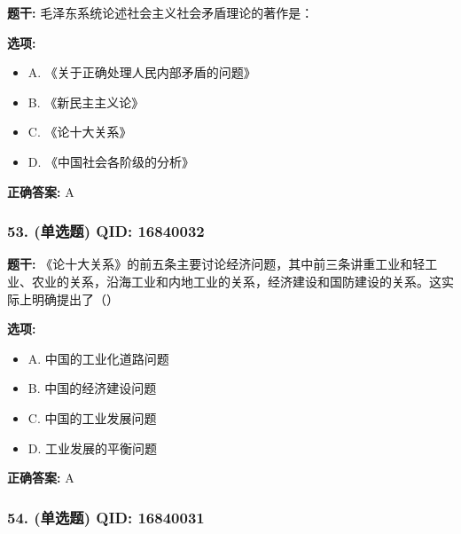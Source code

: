 \documentclass[12pt,UTF8]{ctexart}
\begin{document}
\textbf{题干:}
毛泽东系统论述社会主义社会矛盾理论的著作是：

\textbf{选项:}
\begin{itemize}[leftmargin=*]

  \item A. 《关于正确处理人民内部矛盾的问题》

  \item B. 《新民主主义论》

  \item C. 《论十大关系》

  \item D. 《中国社会各阶级的分析》

\end{itemize}

\textbf{正确答案:}
A

\vspace{0.3em}\hrulefill\vspace{0.7em}

\subsubsection*{53. (单选题) \small QID: 16840032}

\textbf{题干:}
《论十大关系》的前五条主要讨论经济问题，其中前三条讲重工业和轻工业、农业的关系，沿海工业和内地工业的关系，经济建设和国防建设的关系。这实际上明确提出了（）

\textbf{选项:}
\begin{itemize}[leftmargin=*]

  \item A. 中国的工业化道路问题

  \item B. 中国的经济建设问题

  \item C. 中国的工业发展问题

  \item D. 工业发展的平衡问题

\end{itemize}

\textbf{正确答案:}
A

\vspace{0.3em}\hrulefill\vspace{0.7em}

\subsubsection*{54. (单选题) \small QID: 16840031}
\end{document}
